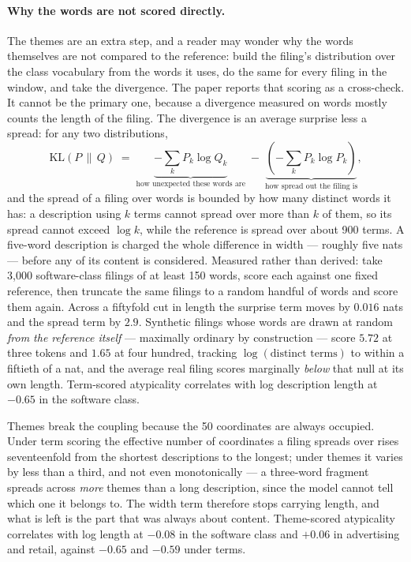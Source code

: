 \paragraph{Why the words are not scored directly.} The themes are an extra
step, and a reader may wonder why the words themselves are not compared to the
reference: build the filing's distribution over the class vocabulary from the
words it uses, do the same for every filing in the window, and take the
divergence. The paper reports that scoring as a cross-check. It cannot be the
primary one, because a divergence measured on words mostly counts the length
of the filing. The divergence is an average surprise less a spread: for any
two distributions,
\[
  \mathrm{KL}(P \,\|\, Q) \;=\; \underbrace{-\textstyle\sum_k P_k \log Q_k}_{\text{how unexpected these words are}}
  \;-\; \underbrace{\left(-\textstyle\sum_k P_k \log P_k\right)}_{\text{how spread out the filing is}} ,
\]
and the spread of a filing over words is bounded by how many distinct words it
has: a description using $k$ terms cannot spread over more than $k$ of them,
so its spread cannot exceed $\log k$, while the reference is spread over about
900 terms. A five-word description is charged the whole difference in width
--- roughly five nats --- before any of its content is considered. Measured
rather than derived: take 3{,}000 software-class filings of at least 150 words,
score each against one fixed reference, then truncate the same filings to a
random handful of words and score them again. Across a fiftyfold cut in length
the surprise term moves by $0.016$ nats and the spread term by $2.9$. Synthetic
filings whose words are drawn at random \emph{from the reference itself} ---
maximally ordinary by construction --- score $5.72$ at three tokens and $1.65$
at four hundred, tracking $\log(\text{distinct terms})$ to within a fiftieth of
a nat, and the average real filing scores marginally \emph{below} that null at
its own length. Term-scored atypicality correlates with log description length
at $-0.65$ in the software class.

Themes break the coupling because the 50 coordinates are always occupied.
Under term scoring the effective number of coordinates a filing spreads over
rises seventeenfold from the shortest descriptions to the longest; under
themes it varies by less than a third, and not even monotonically --- a
three-word fragment spreads across \emph{more} themes than a long description,
since the model cannot tell which one it belongs to. The width term therefore
stops carrying length, and what is left is the part that was always about
content. Theme-scored atypicality correlates with log length at $-0.08$ in the
software class and $+0.06$ in advertising and retail, against $-0.65$ and
$-0.59$ under terms.

